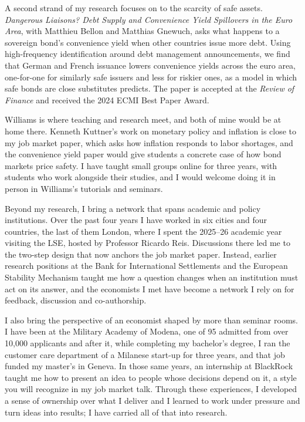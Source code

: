 \documentclass[11pt]{article}
\begin{document}
A second strand of my research focuses on to the scarcity of safe assets. \textit{Dangerous Liaisons? Debt Supply and Convenience Yield Spillovers in the Euro Area}, with Matthieu Bellon and Matthias Gnewuch, asks what happens to a sovereign bond's convenience yield when other countries issue more debt. Using high-frequency identification around debt management announcements, we find that German and French issuance lowers convenience yields across the euro area, one-for-one for similarly safe issuers and less for riskier ones, as a model in which safe bonds are close substitutes predicts. The paper is accepted at the \textit{Review of Finance} and received the 2024 ECMI Best Paper Award.

Williams is where teaching and research meet, and both of mine would be at home there. Kenneth Kuttner's work on monetary policy and inflation is close to my job market paper, which asks how inflation responds to labor shortages, and the convenience yield paper would give students a concrete case of how bond markets price safety. I have taught small groups online for three years, with students who work alongside their studies, and I would welcome doing it in person in Williams's tutorials and seminars.

Beyond my research, I bring a network that spans academic and policy institutions. Over the past four years I have worked in six cities and four countries, the last of them London, where I spent the 2025--26 academic year visiting the LSE, hosted by Professor Ricardo Reis. Discussions there led me to the two-step design that now anchors the job market paper. Instead, earlier research positions at the Bank for International Settlements and the European Stability Mechanism taught me how a question changes when an institution must act on its answer, and the economists I met have become a network I rely on for feedback, discussion and co-authorship.

I also bring the perspective of an economist shaped by more than seminar rooms. I have been at the Military Academy of Modena, one of 95 admitted from over 10,000 applicants and after it, while completing my bachelor's degree, I ran the customer care department of a Milanese start-up for three years, and that job funded my master's in Geneva. In those same years, an internship at BlackRock taught me how to present an idea to people whose decisions depend on it, a style you will recognize in my job market talk. Through these experiences, I developed a sense of ownership over what I deliver and I learned to work under pressure and turn ideas into results; I have carried all of that into research. %
\end{document}

